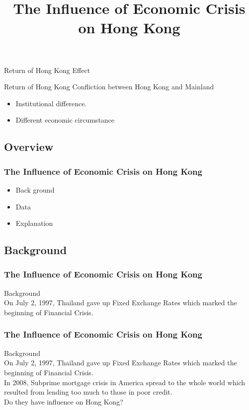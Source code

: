 \documentclass[slidestop,uncompress,mathsans, 12pt]{beamer}
\begin{document}
\begin{frame}{Return of Hong Kong}
Effect
\begin{block}{}
\end{block}
\end{frame}
\begin{frame}{Return of Hong Kong}
Confliction between Hong Kong and Mainland\\
\begin{itemize}
\bigskip
\item Institutional difference.
\bigskip
\bigskip
\item Different economic circumstance 
\end{itemize}


\end{frame}
\subsection{Overview}
\begin{frame}
\title{The Influence of Economic Crisis on Hong Kong }
\date{}
\titlepage
\end{frame}
\begin{frame}
\frametitle{The Influence of Economic Crisis on Hong Kong 
}
\begin{itemize}
\item Back ground
\bigskip
\item Data
\bigskip
\item Explanation
\end{itemize}
\end{frame}

\subsection{Background}
\begin{frame}

\frametitle{The Influence of Economic Crisis on Hong Kong }
Background\\
\bigskip
\transglitter[direction=315]
On July 2, 1997, Thailand gave up Fixed Exchange Rates which marked the beginning of Financial Crisis.\\
\end{frame}
\begin{frame}
\frametitle{The Influence of Economic Crisis on Hong Kong }
Background\\
\bigskip
On July 2, 1997, Thailand gave up Fixed Exchange Rates which marked the beginning of Financial Crisis.\\
\bigskip
{}
In 2008, Subprime mortgage crisis in America spread to the whole world which resulted from lending too much to those in poor credit.
\\
\bigskip
Do they have influence on Hong Kong? 
\end{frame}
\end{document}
